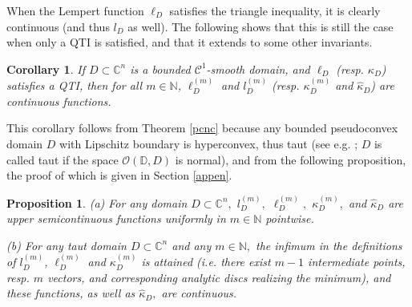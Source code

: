 \documentclass[a4paper,12pt]{amsart}
\def\D{\mathbb D}
\def\C{\mathbb C}
\def\N{\mathbb N}
\newtheorem{prop}[thm]{Proposition}
\newtheorem{cor}[thm]{Corollary}
\renewcommand{\k}{\kappa}
\begin{document}
When the Lempert function $\ell_D$ satisfies the triangle inequality,
it is clearly continuous (and thus $l_D$ as well). The following  shows that this is still the case when only a QTI is satisfied, and that it extends
to some other invariants.

\begin{cor}
\label{corcont}
If $D \subset \C^n$ is a bounded $\mathcal C^1$-smooth  domain, and $\ell_D$ (resp. $\k_D$) satisfies a QTI,
then for all $m \in\N$, $\ell_D^{(m)}$ and $l_D^{(m)}$ 
(resp. $\kappa_D^{(m)}$ and $\hat\kappa_D$) are continuous functions.
\end{cor}


This corollary follows from Theorem \ref{pcnc} because any bounded pseudoconvex domain $D$ with Lipschitz
boundary is hyperconvex, thus taut (see e.g. \cite[Remark 3.2.3 (b)]{JP}; $D$ is called taut
if the space $\mathcal O(\D,D)$ is normal), and from the following proposition,
the proof of which is given in Section \ref{appen}.

\begin{prop}
\label{cont}
(a) For any domain $D\subset\C^n,$ $l_D^{(m)},$ $\ell_D^{(m)},$ $\k_D^{(m)},$ and $\hat\k_D$ are upper semicontinuous functions uniformly
in $m\in\N$ pointwise.

(b) For any taut domain $D\subset\C^n$ and any $m\in\N,$ the infimum in the definitions of $l_D^{(m)}$, $\ell_D^{(m)}$  and $\k_D^{(m)}$
is attained (i.e. there exist $m-1$ intermediate
points, resp. $m$ vectors,  and corresponding analytic discs realizing the
minimum), and these functions, as well as $\hat\k_D,$ are continuous.
\end{prop}
\end{document}
